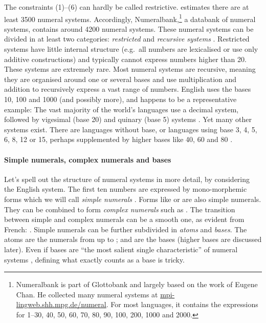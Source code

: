 \documentclass{../src/bcthesispart}
\begin{document}
The constraints (1)--(6) can hardly be called restrictive. 
\textcite{Hammarstrom2009} estimates there are at least 3500 numeral systems. Accordingly, Numeralbank,\footnote{%
	Numeralbank is part of Glottobank and largely based on the work of Eugene Chan. 
	He collected many numeral systems at \href{https://mpi-lingweb.shh.mpg.de/numeral/}{mpi-lingweb.shh.mpg.de/numeral}{}. 
	For most languages, it contains the expressions for 1--30, 40, 50, 60, 70, 80, 90, 100, 200, 1000 and 2000.
	}
a databank of numeral systems, contains around 4200 numeral systems. 
These numeral systems can be divided in at least two categories: \emph{restricted} and \emph{recursive systems} \textcite{Comrie2011,Xu2014}.
Restricted systems have little internal structure (e.g.\ all numbers are lexicalised or use only additive constructions) and typically cannot express numbers higher than 20. 
These systems are extremely rare. 
Most numeral systems are recursive, meaning they are organised around one or several bases and use multiplication and addition to recursively express a vast range of numbers.
English uses the bases 10, 100 and 1000 (and possibly more), and happens to be a representative example: 
The vast majority of the world’s languages use a decimal system, followed by vigesimal (base 20) and quinary (base 5) systems \parencite{Comrie2013}.
Yet many other systems exist. 
There are languages without base, or languages using base 3, 4, 5, 6, 8, 12 or 15, perhaps supplemented by higher bases like 40, 60 and 80 \parencite[see][for a survey]{Hammarstrom2009}.




\paragraph{Simple numerals, complex numerals and bases}

Let’s spell out the structure of numeral systems in more detail, by considering the English system. 
The first ten numbers are expressed by mono-morphemic forms which we will call \emph{simple numerals} \parencite{VonMengden2008}.
Forms like  or  are also simple numerals.
They can be combined to form \emph{complex numerals} such as .
The transition between simple and complex numerals can be a smooth one, as evident from French:  \parencite{Calude2016}.
Simple numerals can be further subdivided in \emph{atoms} and \emph{bases}. 
The atoms are the numerals from  up to ;  and  are the bases (higher bases are discussed later).
Even if bases are “the most salient single characteristic” of numeral systems \parencite{Hammarstrom2009}, defining what exactly counts as a base is tricky. 
\end{document}
